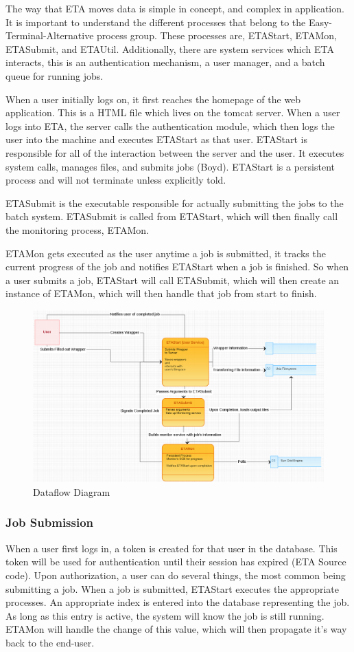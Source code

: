 \documentclass[a4paper,12pt]{article}
\begin{document}
 The way that ETA moves data is simple in concept, and complex in application. It is important to understand the different processes that belong to the Easy-Terminal-Alternative process group. These processes are, ETAStart, ETAMon, ETASubmit, and ETAUtil. Additionally, there are system services which ETA interacts, this is an authentication mechanism, a user manager, and a batch queue  for running jobs.
 
 When a user initially logs on, it first reaches the homepage of the web application. This is a HTML file which lives on the tomcat server. When a user logs into ETA, the server calls the authentication module, which then logs the user into the machine and executes ETAStart as that user. ETAStart is responsible for all of the interaction between the server and the user. It executes system calls, manages files, and submits jobs (Boyd). ETAStart is a persistent process and will not terminate unless explicitly told. 
 
 ETASubmit is the executable responsible for actually submitting the jobs to the batch system. ETASubmit is called from ETAStart, which will then finally call the monitoring process, ETAMon.
 
 ETAMon gets executed as the user anytime a job is submitted, it tracks the current progress of the job and notifies ETAStart when a job is finished. So when a user submits a job, ETAStart will call ETASubmit, which will then create an instance of ETAMon, which will then handle that job from start to finish.

 \begin{figure}
\includegraphics[width=1\textwidth]{DataflowDiagram.png}
\caption{Dataflow Diagram}
\label{fig:Dataflow Diagram}
\end{figure}
 \subsubsection{Job Submission}
 When a user first logs in, a token is created for that user in the database. This token will be used for authentication until their session has expired (ETA Source code). Upon authorization, a user can do several things, the most common being submitting a job. When a job is submitted, ETAStart executes the appropriate processes. An appropriate index is entered into the database representing the job. As long as this entry is active, the system will know the job is still running. ETAMon will handle the change of this value, which will then propagate it's way back to the end-user.
 
\end{document}
